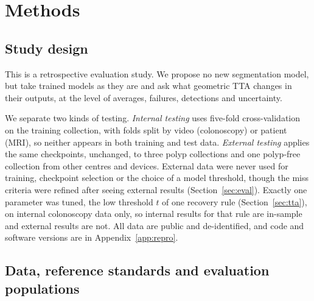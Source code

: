 \section{Methods}
\label{sec:methods}


\subsection{Study design}
\label{sec:design}
This is a retrospective evaluation study. We propose no new segmentation model, but take trained models as they are and ask what geometric TTA changes in their outputs, at the level of averages, failures, detections and uncertainty.

We separate two kinds of testing. \emph{Internal testing} uses five-fold cross-validation on the training collection, with folds split by video (colonoscopy) or patient (MRI), so neither appears in both training and test data. \emph{External testing} applies the same checkpoints, unchanged, to three polyp collections and one polyp-free collection from other centres and devices. External data were never used for training, checkpoint selection or the choice of a model threshold, though the miss criteria were refined after seeing external results (Section~\ref{sec:eval}). Exactly one parameter was tuned, the low threshold $t$ of one recovery rule (Section~\ref{sec:tta}), on internal colonoscopy data only, so internal results for that rule are in-sample and external results are not. All data are public and de-identified, and code and software versions are in Appendix~\ref{app:repro}.

\subsection{Data, reference standards and evaluation populations}
\label{sec:data}

